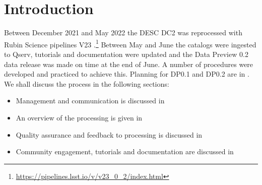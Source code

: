 \section{Introduction}\label{sec:intro}

Between December 2021 and May 2022 the DESC DC2 \citep{2021ApJS..253...31L} was reprocessed with Rubin Science pipelines V23 .\footnote{\url{https://pipelines.lsst.io/v/v23_0_2/index.html}}
Between May and June the catalogs were ingested to Qserv, tutorials and documentation were updated and the Data Preview 0.2 data release was made on time at the end of June.
A number of procedures were developed and practiced to achieve this.
Planning for DP0.1 and DP0.2 are in .
We shall discuss the process in the following sections:

\begin{itemize}
\item  Management and communication is discussed in 
\item An overview of the processing is given in 
\item Quality assurance and feedback to processing is discussed in  
\item Community engagement, tutorials and documentation are discussed in 
\end{itemize}
